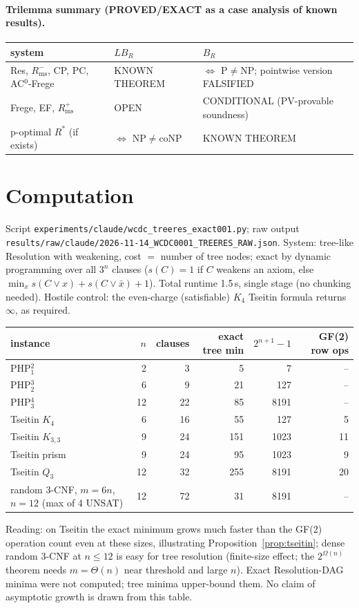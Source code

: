 \documentclass[11pt]{article}
\begin{document}
\paragraph{Trilemma summary (PROVED/EXACT as a case analysis of known results).}
\begin{center}
\begin{tabular}{lll}
\toprule
system & $LB_R$ & $B_R$ \\
\midrule
Res, $R^-_{\mathrm{ms}}$, CP, PC, AC$^0$-Frege & KNOWN THEOREM & $\iff$ P$\ne$NP; pointwise version FALSIFIED \\
Frege, EF, $R^+_{\mathrm{ms}}$ & OPEN & CONDITIONAL (PV-provable soundness) \\
p-optimal $R^\ast$ (if exists) & $\iff$ NP$\ne$coNP & KNOWN THEOREM \\
\bottomrule
\end{tabular}
\end{center}

\section{Computation}\label{sec:exp}
Script \texttt{experiments/claude/wcdc\_treeres\_exact001.py}; raw output
\texttt{results/raw/claude/2026-11-14\_WCDC0001\_TREERES\_RAW.json}. System: tree-like Resolution with
weakening, cost $=$ number of tree nodes; exact by dynamic programming over all $3^n$ clauses
($s(C)=1$ if $C$ weakens an axiom, else $\min_x s(C\vee x)+s(C\vee\bar x)+1$). Total runtime 1.5\,s,
single stage (no chunking needed). Hostile control: the even-charge (satisfiable) $K_4$ Tseitin
formula returns $\infty$, as required.
\begin{center}
\begin{tabular}{lrrrrr}
\toprule
instance & $n$ & clauses & exact tree min & $2^{n+1}-1$ & GF(2) row ops\\
\midrule
PHP$^{2}_{1}$ & 2 & 3 & 5 & 7 & --\\
PHP$^{3}_{2}$ & 6 & 9 & 21 & 127 & --\\
PHP$^{4}_{3}$ & 12 & 22 & 85 & 8191 & --\\
Tseitin $K_4$ & 6 & 16 & 55 & 127 & 5\\
Tseitin $K_{3,3}$ & 9 & 24 & 151 & 1023 & 11\\
Tseitin prism & 9 & 24 & 95 & 1023 & 9\\
Tseitin $Q_3$ & 12 & 32 & 255 & 8191 & 20\\
random 3-CNF, $m=6n$, $n=12$ (max of 4 UNSAT) & 12 & 72 & 31 & 8191 & --\\
\bottomrule
\end{tabular}
\end{center}
Reading: on Tseitin the exact minimum grows much faster than the GF(2) operation count even at these
sizes, illustrating Proposition~\ref{prop:tseitin}; dense random 3-CNF at $n\le12$ is easy for tree
resolution (finite-size effect; the $2^{\Omega(n)}$ theorem needs $m=\Theta(n)$ near threshold and large $n$).
Exact Resolution-DAG minima were not computed; tree minima upper-bound them.
No claim of asymptotic growth is drawn from this table.
\end{document}
